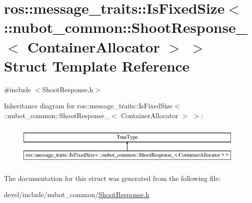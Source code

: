 \hypertarget{structros_1_1message__traits_1_1IsFixedSize_3_01_1_1nubot__common_1_1ShootResponse___3_01ContainerAllocator_01_4_01_4}{\section{ros\-:\-:message\-\_\-traits\-:\-:Is\-Fixed\-Size$<$ \-:\-:nubot\-\_\-common\-:\-:Shoot\-Response\-\_\-$<$ Container\-Allocator $>$ $>$ Struct Template Reference}
\label{structros_1_1message__traits_1_1IsFixedSize_3_01_1_1nubot__common_1_1ShootResponse___3_01ContainerAllocator_01_4_01_4}
}


{\ttfamily \#include $<$Shoot\-Response.\-h$>$}

Inheritance diagram for ros\-:\-:message\-\_\-traits\-:\-:Is\-Fixed\-Size$<$ \-:\-:nubot\-\_\-common\-:\-:Shoot\-Response\-\_\-$<$ Container\-Allocator $>$ $>$\-:\begin{figure}[H]
\begin{center}
\leavevmode
\includegraphics[height=2.000000cm]{structros_1_1message__traits_1_1IsFixedSize_3_01_1_1nubot__common_1_1ShootResponse___3_01ContainerAllocator_01_4_01_4}
\end{center}
\end{figure}


The documentation for this struct was generated from the following file\-:\begin{DoxyCompactItemize}
\item 
devel/include/nubot\-\_\-common/\hyperlink{ShootResponse_8h}{Shoot\-Response.\-h}\end{DoxyCompactItemize}
